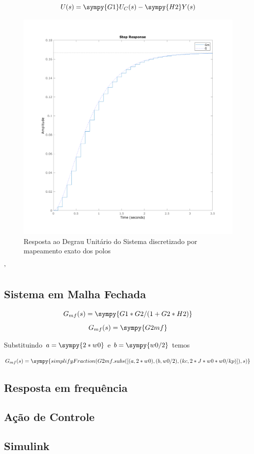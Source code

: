 \documentclass[a4paper,11pt]{article}
\begin{document}
\begin{equation}
    U(s) = \sympy{G1}U_C(s) - \sympy{H2}Y(s)
\end{equation}

\begin{figure}[H]
    \centering
    \includegraphics[width=0.8\linewidth]{img/exsim2-plot-g-matched.png}
    \caption{Resposta ao Degrau Unitário do Sistema discretizado por mapeamento exato dos polos}
\end{figure}
'
\subsection{Sistema em Malha Fechada}

$$G_{mf}(s) = \sympy{G1*G2/(1+G2*H2)}$$
$$G_{mf}(s) = \sympy{G2mf}$$

Substituindo $a = \sympy{2*w0}$ e $b = \sympy{w0/2}$ temos

\begin{equation}
    G_{mf}(s) = \sympy{simplifyFraction(G2mf.subs([(a,2*w0),(b,w0/2),(kc,2*J*w0*w0/kp)]),s)}
\end{equation}

\subsection{Resposta em frequência}
\subsection{Ação de Controle}
\subsection{Simulink}
\end{document}
